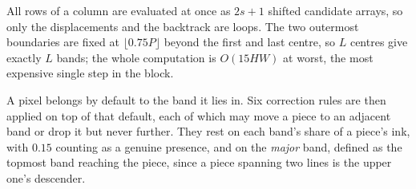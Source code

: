 All rows of a column are evaluated at once as $2s+1$ shifted candidate arrays, so only the displacements and the backtrack are loops. The two outermost boundaries are fixed at $\lfloor0.75P\rfloor$ beyond the first and last centre, so $L$ centres give exactly $L$ bands; the whole computation is $O(15HW)$ at worst, the most expensive single step in the block.

A pixel belongs by default to the band it lies in. Six correction rules are then applied on top of that default, each of which may move a piece to an adjacent band or drop it but never further. They rest on each band's share of a piece's ink, with $0.15$ counting as a genuine presence, and on the \emph{major} band, defined as the topmost band reaching the piece, since a piece spanning two lines is the upper one's descender.


